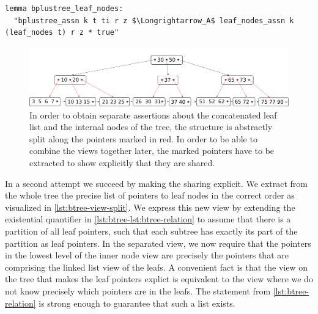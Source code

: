 \documentclass[a4paper,UKenglish,cleveref, autoref, thm-restate]{lipics-v2021}
\newcommand{\btree}{B$^+$-Tree}
\begin{document}
\begin{lstlisting}[mathescape=true, language=Isabelle,label=lst:btree-view-split-oneway]
lemma bplustree_leaf_nodes:
  "bplustree_assn k t ti r z $\Longrightarrow_A$ leaf_nodes_assn k (leaf_nodes t) r z * true"
\end{lstlisting}

\begin{figure}
    \centering
    \includegraphics[width=1\linewidth]{btree-view-split.pdf}
    \caption[Split view of the \btree]
    {In order to obtain separate assertions about the concatenated leaf list
    and the internal nodes of the tree, the structure is abstractly split along the
    pointers marked in red. In order to be able to combine the views together later,
    the marked pointers have to be extracted to show explicitly that they are shared.}
    \label{fig:btree-view-split}
\end{figure}

In a second attempt we succeed by making the sharing explicit.
We extract from the whole tree the precise list of pointers to leaf nodes
in the correct order as visualized in \autoref{lst:btree-view-split}.
We express this new view by extending the existential quantifier in \autoref{lst:btree-lst:btree-relation}
to assume that there is a partition of all leaf pointers,
such that each subtree has exactly its part of the partition as leaf pointers.
In the separated view, we now require that the pointers
in the lowest level of the inner node view are precisely the pointers
that are comprising the linked list view of the leafs.
A convenient fact is that the view on the tree that makes the leaf pointers explict
is equivalent to the view where we do not know precisely which pointers are in the leafs.
The statement from \autoref{lst:btree-relation} is strong enough to guarantee that such a list exists.
\end{document}
